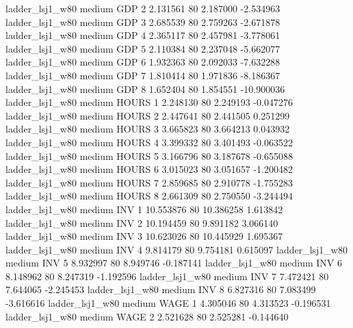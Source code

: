     ladder_lsj1_w80     medium      GDP                 2  2.131561 80       2.187000          -2.534963
    ladder_lsj1_w80     medium      GDP                 3  2.685539 80       2.759263          -2.671878
    ladder_lsj1_w80     medium      GDP                 4  2.365117 80       2.457981          -3.778061
    ladder_lsj1_w80     medium      GDP                 5  2.110384 80       2.237048          -5.662077
    ladder_lsj1_w80     medium      GDP                 6  1.932363 80       2.092033          -7.632288
    ladder_lsj1_w80     medium      GDP                 7  1.810414 80       1.971836          -8.186367
    ladder_lsj1_w80     medium      GDP                 8  1.652404 80       1.854551         -10.900036
    ladder_lsj1_w80     medium    HOURS                 1  2.248130 80       2.249193          -0.047276
    ladder_lsj1_w80     medium    HOURS                 2  2.447641 80       2.441505           0.251299
    ladder_lsj1_w80     medium    HOURS                 3  3.665823 80       3.664213           0.043932
    ladder_lsj1_w80     medium    HOURS                 4  3.399332 80       3.401493          -0.063522
    ladder_lsj1_w80     medium    HOURS                 5  3.166796 80       3.187678          -0.655088
    ladder_lsj1_w80     medium    HOURS                 6  3.015023 80       3.051657          -1.200482
    ladder_lsj1_w80     medium    HOURS                 7  2.859685 80       2.910778          -1.755283
    ladder_lsj1_w80     medium    HOURS                 8  2.661309 80       2.750550          -3.244494
    ladder_lsj1_w80     medium      INV                 1 10.553876 80      10.386258           1.613842
    ladder_lsj1_w80     medium      INV                 2 10.194459 80       9.891182           3.066140
    ladder_lsj1_w80     medium      INV                 3 10.623026 80      10.445929           1.695367
    ladder_lsj1_w80     medium      INV                 4  9.814179 80       9.754181           0.615097
    ladder_lsj1_w80     medium      INV                 5  8.932997 80       8.949746          -0.187141
    ladder_lsj1_w80     medium      INV                 6  8.148962 80       8.247319          -1.192596
    ladder_lsj1_w80     medium      INV                 7  7.472421 80       7.644065          -2.245453
    ladder_lsj1_w80     medium      INV                 8  6.827316 80       7.083499          -3.616616
    ladder_lsj1_w80     medium     WAGE                 1  4.305046 80       4.313523          -0.196531
    ladder_lsj1_w80     medium     WAGE                 2  2.521628 80       2.525281          -0.144640
